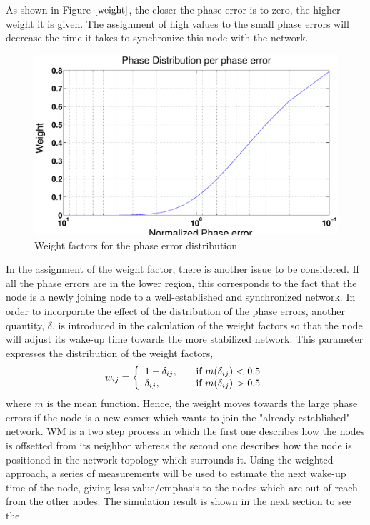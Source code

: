 \documentclass[a4paper,10pt]{report}
\begin{document}
\newline
As shown in Figure $\ref{weight}$, the closer the phase error is to zero, the higher weight it is given. The assignment of high
values to the small phase errors will decrease the time it takes to synchronize this node with the network.
\begin{figure}
\centering
\includegraphics[width= 0.6 \textwidth]{weight}
\caption{Weight factors for the phase error distribution}
\label{weight}
\end{figure}
\newline
In the assignment of the weight factor, there is another issue to be considered. If all the phase errors are in the lower region, this
corresponds to the fact that the node is a newly joining node to a well-established and synchronized network.  In order to incorporate the
effect of the distribution of the phase errors, another quantity, $\delta$, is introduced in the calculation of the weight factors so
that the node will adjust its wake-up time towards the more stabilized network. This parameter expresses the distribution of the
weight factors,
\[w_{ij} = \left\{
\begin{array}{l l}
  1 - \delta_{ij},& \quad \mbox{if $m(\delta_{ij}$) $<$ 0.5}\\
 \delta_{ij}, & \quad \mbox{if $m(\delta_{ij}$) $>$ 0.5}\\ \end{array} \right. \]
 where $m$ is the mean function.
\newline
Hence, the weight moves towards the large phase errors if the node is a new-comer which wants to join the "already established" network. WM is a two step process in which the first one describes how the nodes is offsetted from its neighbor whereas the second one describes how the node is positioned in the network topology which surrounds it.
\newline
Using the weighted approach, a series of measurements will be used to estimate the next wake-up time of the node, giving less
value/emphasis to the nodes which are out of reach from the other nodes. The simulation result is shown in the next section to see the
\end{document}
